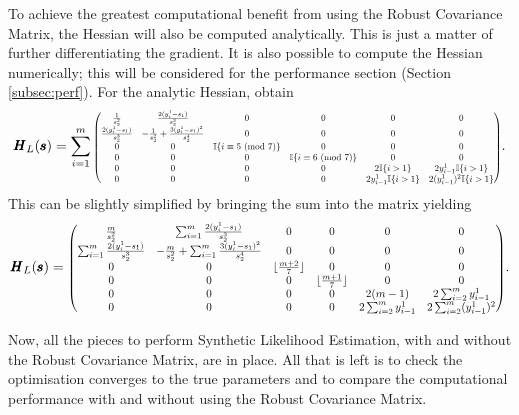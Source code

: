 To achieve the greatest computational benefit from using the Robust Covariance Matrix, the Hessian will also be computed analytically. This is just a matter of further differentiating the gradient. It is also possible to compute the Hessian numerically; this will
be considered for the performance section (Section \ref{subsec:perf}). For the analytic Hessian, obtain
\begin{equation}
    \pmb{H}_L(\pmb{s}) = \sum_{i=1}^m \scalemath{0.65}{\begin{pmatrix}
        \frac{1}{s_2^2} & \frac{2(y^1_i - s_1)}{s_2^3} & 0 & 0 & 0 & 0 \\
        \frac{2(y^1_i - s_1)}{s_2^3} & -\frac{1}{s_2^2} + \frac{3(y^1_i -s_1)^2}{s_2^4} & 0 & 0 & 0 & 0 \\
        0 & 0 & \mathbb{I}\{i \equiv 5 \Mod{7}\} & 0 & 0 & 0 \\
        0 & 0 & 0 & \mathbb{I}\{i \equiv 6 \Mod{7}\} & 0 & 0 \\
        0 & 0 & 0 & 0 & 2\mathbb{I}\{i > 1\} & 2y^1_{i-1}\mathbb{I}\{i > 1\} \\
        0 & 0 & 0 & 0 & 2y^1_{i-1}\mathbb{I}\{i > 1\} & 2(y^1_{i-1})^2\mathbb{I}\{i > 1\}
    \end{pmatrix}}.
\end{equation}
This can be slightly simplified by bringing the sum into the matrix yielding
\begin{equation}
    \pmb{H}_L(\pmb{s}) = \scalemath{0.8}{\begin{pmatrix}
        \frac{m}{s_2^2} & \sum_{i=1}^m \frac{2(y^1_i - s_1)}{s_2^3} & 0 & 0 & 0 & 0 \\
        \sum_{i=1}^m \frac{2(y^1_i - s_1)}{s_2^3} & -\frac{m}{s_2^2} + \sum_{i=1}^m \frac{3(y^1_i-s_1)^2}{s_2^4} & 0 & 0 & 0 & 0 \\
        0 & 0 & \floor{\frac{m+2}{7}} & 0 & 0 & 0 \\
        0 & 0 & 0 & \floor{\frac{m+1}{7}} & 0 & 0 \\
        0 & 0 & 0 & 0 & 2(m-1) & 2\sum_{i=2}^m y^1_{i-1} \\
        0 & 0 & 0 & 0 & 2\sum_{i=2}^m y^1_{i-1} & 2\sum_{i=2}^m (y^1_{i-1})^2
    \end{pmatrix}}.
\end{equation}

Now, all the pieces to perform Synthetic Likelihood Estimation, with and without the Robust Covariance Matrix, are in place. All that is left is to check the optimisation converges to the true parameters and to compare the computational performance with and without using the Robust Covariance Matrix.

